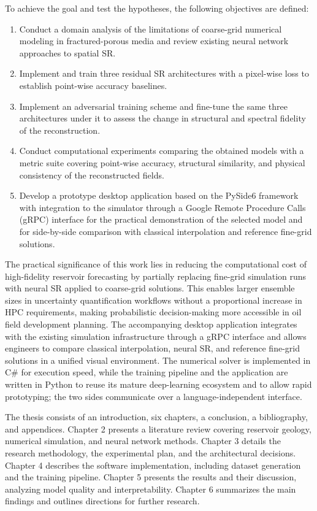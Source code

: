 To achieve the goal and test the hypotheses, the following objectives are defined:

\begin{enumerate}
    \item Conduct a domain analysis of the limitations of coarse-grid numerical modeling in fractured-porous media and review existing neural network approaches to spatial SR.

    \item Implement and train three residual SR architectures with a pixel-wise loss to establish point-wise accuracy baselines.

    \item Implement an adversarial training scheme and fine-tune the same three architectures under it to assess the change in structural and spectral fidelity of the reconstruction.

    \item Conduct computational experiments comparing the obtained models with a metric suite covering point-wise accuracy, structural similarity, and physical consistency of the reconstructed fields.

    \item Develop a prototype desktop application based on the PySide6 framework with integration to the simulator through a Google Remote Procedure Calls (gRPC) interface for the practical demonstration of the selected model and for side-by-side comparison with classical interpolation and reference fine-grid solutions.
\end{enumerate}

The practical significance of this work lies in reducing the computational cost of high-fidelity reservoir forecasting by partially replacing fine-grid simulation runs with neural SR applied to coarse-grid solutions. This enables larger ensemble sizes in uncertainty quantification workflows without a proportional increase in HPC requirements, making probabilistic decision-making more accessible in oil field development planning. The accompanying desktop application integrates with the existing simulation infrastructure through a gRPC interface and allows engineers to compare classical interpolation, neural SR, and reference fine-grid solutions in a unified visual environment. The numerical solver is implemented in C\# for execution speed, while the training pipeline and the application are written in Python to reuse its mature deep-learning ecosystem and to allow rapid prototyping; the two sides communicate over a language-independent interface.

The thesis consists of an introduction, six chapters, a conclusion, a bibliography, and appendices. Chapter 2 presents a literature review covering reservoir geology, numerical simulation, and neural network methods. Chapter 3 details the research methodology, the experimental plan, and the architectural decisions. Chapter 4 describes the software implementation, including dataset generation and the training pipeline. Chapter 5 presents the results and their discussion, analyzing model quality and interpretability. Chapter 6 summarizes the main findings and outlines directions for further research.
